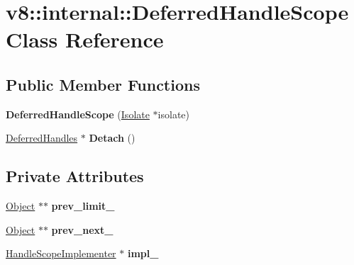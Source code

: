 \hypertarget{classv8_1_1internal_1_1_deferred_handle_scope}{}\section{v8\+:\+:internal\+:\+:Deferred\+Handle\+Scope Class Reference}
\label{classv8_1_1internal_1_1_deferred_handle_scope}
\subsection*{Public Member Functions}
\begin{DoxyCompactItemize}
\item 
{\bfseries Deferred\+Handle\+Scope} (\hyperlink{classv8_1_1internal_1_1_isolate}{Isolate} $\ast$isolate)\hypertarget{classv8_1_1internal_1_1_deferred_handle_scope_a2a9abeb6fc8fa52bedb8a4de7d8d502a}{}\label{classv8_1_1internal_1_1_deferred_handle_scope_a2a9abeb6fc8fa52bedb8a4de7d8d502a}

\item 
\hyperlink{classv8_1_1internal_1_1_deferred_handles}{Deferred\+Handles} $\ast$ {\bfseries Detach} ()\hypertarget{classv8_1_1internal_1_1_deferred_handle_scope_a5aa6f8468dd39ead6bc36caec86db65f}{}\label{classv8_1_1internal_1_1_deferred_handle_scope_a5aa6f8468dd39ead6bc36caec86db65f}

\end{DoxyCompactItemize}
\subsection*{Private Attributes}
\begin{DoxyCompactItemize}
\item 
\hyperlink{classv8_1_1internal_1_1_object}{Object} $\ast$$\ast$ {\bfseries prev\+\_\+limit\+\_\+}\hypertarget{classv8_1_1internal_1_1_deferred_handle_scope_a0b06f8c21f958f0f6e0fb4d4ad9fba8b}{}\label{classv8_1_1internal_1_1_deferred_handle_scope_a0b06f8c21f958f0f6e0fb4d4ad9fba8b}

\item 
\hyperlink{classv8_1_1internal_1_1_object}{Object} $\ast$$\ast$ {\bfseries prev\+\_\+next\+\_\+}\hypertarget{classv8_1_1internal_1_1_deferred_handle_scope_a91e442ca207bb2083aa81469dab08529}{}\label{classv8_1_1internal_1_1_deferred_handle_scope_a91e442ca207bb2083aa81469dab08529}

\item 
\hyperlink{classv8_1_1internal_1_1_handle_scope_implementer}{Handle\+Scope\+Implementer} $\ast$ {\bfseries impl\+\_\+}\hypertarget{classv8_1_1internal_1_1_deferred_handle_scope_a3562e4f6015de5f10f438650d2aad6b1}{}\label{classv8_1_1internal_1_1_deferred_handle_scope_a3562e4f6015de5f10f438650d2aad6b1}

\end{DoxyCompactItemize}
